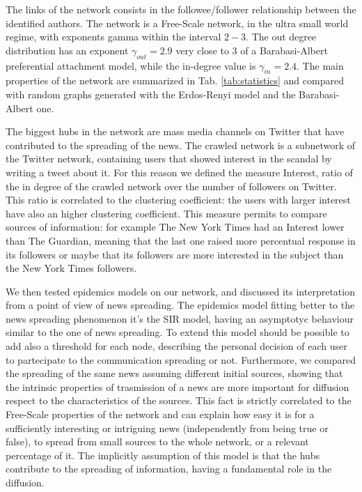 \documentclass[11pt, twoside]{report}
\begin{document}
    The links of the network consists in the followee/follower relationship between the identified authors.
    The network is a Free-Scale network, in the ultra small world regime, with exponents gamma within the interval $2-3$.
    The out degree distribution has an exponent $\gamma_{out}=2.9 $ very close to 3 of a Barabasi-Albert preferential attachment model,
    while the in-degree value is $\gamma_{in} = 2.4$. The main properties of the network are summarized in Tab. \ref{tab:statistics} and compared with random graphs generated with the Erdos-Renyi model and the Barabasi-Albert one.

    The biggest hubs in the network are mass media channels on Twitter that have contributed to the spreading of the news.
    The crawled network is a subnetwork of the Twitter network, containing users that showed interest in the scandal by writing a tweet about it.
    For this reason we defined the measure Interest, ratio of the in degree of the crawled network over the number of followers on Twitter.
    This ratio is correlated to the clustering coefficient: the users with larger interest have also an higher clustering coefficient.
    This measure permits to compare sources of information: for example The New York Times had an Interest lower than The Guardian,
    meaning that the last one raised more percentual response in its followers or maybe that its followers are more interested in the subject
    than the New York Times followers.

    We then tested epidemics models on our network, and discussed its interpretation from a point of view of news spreading.
    The epidemics model fitting better to the news spreading phenomenon it's the SIR model, having an asymptotyc behaviour similar to
    the one of news spreading. To extend this model should be possible to add also a threshold for each node, describing the
    personal decision of each user to partecipate to the communication spreading or not.
    Furthermore, we compared the spreading of the same news assuming different initial sources, showing that the intrinsic properties of trasmission of a news are more important for diffusion respect to the characteristics of the sources.
    This fact is strictly correlated to the Free-Scale properties of the network and can explain how easy it is for a sufficiently interesting or intriguing news (independently from being true or false), to spread from small sources to the whole network, or a relevant percentage of it.
    The implicitly assumption of this model is that the hubs contribute to the spreading of information, having a fundamental role in the diffusion.
\end{document}
